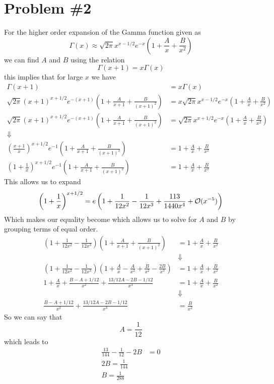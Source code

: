 \documentclass[11pt]{article}
\numberwithin{equation}{section}
\begin{document}
\section{Problem \#2}
For the higher order expansion of the Gamma function given as
$$\Gamma(x) \approx \sqrt{2\pi}x^{x-1/2}e^{-x}\left(1+\frac{A}{x}+\frac{B}{x^2}\right)$$
we can find $A$ and $B$ using the relation
$$\Gamma(x+1) = x\Gamma(x)$$
this implies that for large $x$ we have
\begin{align*}
\Gamma(x+1) &= x\Gamma(x)\\
\sqrt{2\pi}(x+1)^{x+1/2}e^{-(x+1)}\left(1+\frac{A}{x+1}+\frac{B}{(x+1)^2}\right) &= x\sqrt{2\pi}x^{x-1/2}e^{-x}\left(1+\frac{A}{x}+\frac{B}{x^2}\right)\\
\sqrt{2\pi}(x+1)^{x+1/2}e^{-(x+1)}\left(1+\frac{A}{x+1}+\frac{B}{(x+1)^2}\right) &= \sqrt{2\pi}x^{x+1/2}e^{-x}\left(1+\frac{A}{x}+\frac{B}{x^2}\right)\\
\Downarrow\\
\left(\frac{x+1}{x}\right)^{x+1/2}e^{-1}\left(1+\frac{A}{x+1}+\frac{B}{(x+1)^2}\right) &= 1+\frac{A}{x}+\frac{B}{x^2}\\
\left(1+\frac{1}{x}\right)^{x+1/2}e^{-1}\left(1+\frac{A}{x+1}+\frac{B}{(x+1)^2}\right) &= 1+\frac{A}{x}+\frac{B}{x^2}
\end{align*}
This allows us to expand 
$$\left(1+\frac{1}{x}\right)^{x+1/2} = e\left(1+\frac{1}{12x^2}-\frac{1}{12x^3}+\frac{113}{1440x^4}+\mathcal{O}{(x^{-5})}\right)$$
Which makes our equality become which allows us to solve for $A$ and $B$ by grouping terms of
equal order.
\begin{align*}
\left(1+\frac{1}{12x^2}-\frac{1}{12x^3}\right)\left(1+\frac{A}{x+1}+\frac{B}{(x+1)^2} \right) &= 1+\frac{A}{x}+\frac{B}{x^2} \\
&\Downarrow\\
\left(1+\frac{1}{12x^2}-\frac{1}{12x^3}\right)\left(1+\frac{A}{x}-\frac{A}{x^2}+\frac{B}{x^2} - \frac{2B}{x^3}\right) &= 1+\frac{A}{x}+\frac{B}{x^2}\\
1 + \frac{A}{x} + \frac{B-A+1/12}{x^2} + \frac{13/12A-2B-1/12}{x^3} &= 1+\frac{A}{x}+\frac{B}{x^2}\\
&\Downarrow\\
\frac{B-A+1/12}{x^2} + \frac{13/12A-2B-1/12}{x^3} &= \frac{B}{x^2}
\end{align*}
So we can say that
$$A = \frac{1}{12}$$
which leads to 
\begin{align*}
\frac{13}{144}-\frac{1}{12} -2B &= 0\\
2B = \frac{1}{144}\\ 
B = \frac{1}{288}
\end{align*}
\end{document}
